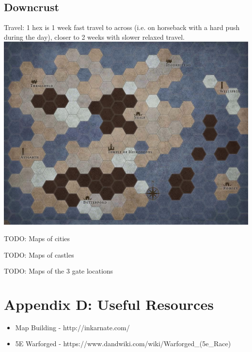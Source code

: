 \documentclass[10pt,twoside,twocolumn]{article}
\begin{document}
\clearpage

\subsection{Downcrust}

Travel: 1 hex is 1 week fast travel to across (i.e. on horseback with a hard push during the day), closer to 2 weeks with slower relaxed travel. \\

\includegraphics[width=\textwidth]{Images/Maps/Downcrust}

\clearpage

TODO: Maps of cities

TODO: Maps of castles

TODO: Maps of the 3 gate locations

\section{Appendix D: Useful Resources}

\begin{itemize}
\item Map Building - http://inkarnate.com/
\item 5E Warforged - https://www.dandwiki.com/wiki/Warforged\_(5e\_Race)
\end{itemize}

\end{document}
